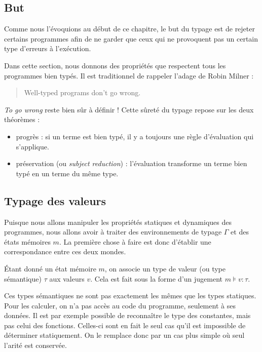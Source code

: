 \subsection{But}

Comme nous l'évoquions au début de ce chapitre, le but du typage est de rejeter
certains programmes afin de ne garder que ceux qui ne provoquent pas un certain
type d'erreurs à l'exécution.

Dans cette section, nous donnons des propriétés que respectent tous les
programmes bien typés. Il est traditionnel de rappeler l'adage de Robin Milner :

\begin{quote}
  Well-typed programs don't go wrong.
\end{quote}

\emph{To go wrong} reste bien sûr à définir ! Cette sûreté du typage repose sur
les deux théorèmes :

\begin{itemize}
\item progrès :
  si un terme est bien typé, il y a toujours une règle
  d'évaluation qui s'applique.
\item
  préservation (ou \emph{subject reduction}) :
  l'évaluation transforme un terme bien typé en un terme du même type.
\end{itemize}

\subsection{Typage des valeurs}

Puisque nous allons manipuler les propriétés statiques et dynamiques des
programmes, nous allons avoir à traiter des environnements de typage $Γ$ et des
états mémoires $m$. La première chose à faire est donc d'établir une
correspondance entre ces deux mondes.

Étant donné un état mémoire $m$, on associe un type de valeur (ou type
sémantique) $τ$ aux valeurs $v$. Cela est fait sous la forme d'un jugement $m ⊧
v : τ$.

Ces types sémantiques ne sont pas exactement les mêmes que les types statiques.
Pour les calculer, on n'a pas accès au code du programme, seulement à ses
données. Il est par exemple possible de reconnaître le type des constantes,
mais pas celui des fonctions. Celles-ci sont en fait le seul cas qu'il est
impossible de déterminer statiquement. On le remplace donc par un cas plus
simple où seul l'arité est conservée.

